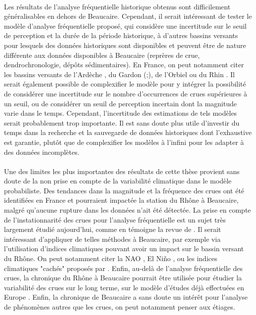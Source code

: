 	\paragraph{} Les résultats de l'analyse fréquentielle historique obtenus sont difficilement généralisables en dehors de Beaucaire. Cependant, il serait intéressant de tester le modèle d'analyse fréquentielle proposé, qui considère une incertitude sur le seuil de perception et la durée de la période historique, à d'autres bassins versants pour lesquels des données historiques sont disponibles et peuvent être de nature différente aux données disponibles à Beaucaire (reprères de crue, dendrochronologie, dépôts sédimentaires). En France, on peut notamment citer les bassins versants de l'Ardèche \citep{naulet_flood_2005} , du Gardon (\cite{neppel_flood_2010};\cite{dezileau_multidating_2014}), de l'Orbiel \citep{payrastre_usefulness_2011} ou du Rhin \citep{lang_evaluation_2022}. Il serait également possible de complexifier le modèle pour y intégrer la possibilité de considérer une incertitude sur le nombre d'occurrences de crues supérieures à un seuil, ou de considérer un seuil de perception incertain dont la magnitude varie dans le temps. Cependant, l'incertitude des estimations de tels modèles serait probablement trop importante. Il est sans doute plus utile d'investir du temps dans la recherche et la sauvegarde de données historiques dont l'exhaustive est garantie, plutôt que de complexifier les modèles à l'infini pour les adapter à des données incomplètes. 
			
	\paragraph{} Une des limites les plus importantes des résultats de cette thèse provient sans doute de la non prise en compte de la variabilité climatique dans le modèle probabiliste. Des tendances dans la magnitude et la fréquence des crues ont été identifiées en France et pourraient impactée la station du Rhône à Beaucaire, malgré qu'aucune rupture dans les données n'ait été détectée. La prise en compte de l'instationnarité des crues pour l'analyse fréquentielle est un sujet très largement étudié aujourd'hui, comme en témoigne la revue de \citet{salas_techniques_2018}. Il serait intéressant d'appliquer de telles méthodes à Beaucaire, par exemple via l'utilisation d'indices climatiques pouvant avoir un impact sur le bassin versant du Rhône. On peut notamment citer la NAO \citep{criado-aldeanueva_climatic_2020}, El Niño \citep{bronnimann_impact_2007}, ou les indices climatiques "cachés" proposés par \citet{renard_hidden_2021}. Enfin, au-delà de l'analyse fréquentielle des crues, la chronique du Rhône à Beaucaire pourrait être utilisée pour étudier la variabilité des crues sur le long terme, sur le modèle d'études déjà effectuées en Europe \citep{bloschl_current_2020}. Enfin, la chronique de Beaucaire a sans doute un intérêt pour l'analyse de phénomènes autres que les crues, on peut notamment penser aux étiages.
	
